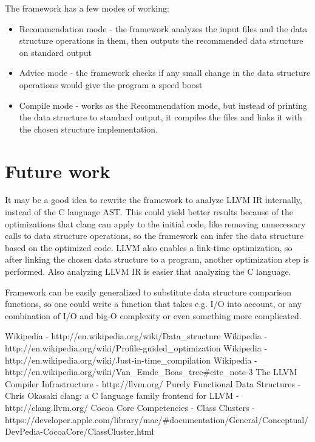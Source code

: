 \documentclass[a4paper,11pt]{article}
\begin{document}
	The framework has a few modes of working:
	\begin{itemize}
		\item Recommendation mode - the framework analyzes the input files and the data structure operations in
			them, then outputs the recommended data structure on standard output
		\item Advice mode - the framework checks if any small change in the data structure operations would give
			the program a speed boost
		\item Compile mode - works as the Recommendation mode, but instead of printing the data structure to
			standard output, it compiles the files and links it with the chosen structure implementation.
	\end{itemize}

\section{Future work} \label{sec:future}
	It may be a good idea to rewrite the framework to analyze LLVM\cite{LLVM} IR internally, instead of the C
	language AST. This could yield better results because of the optimizations that clang\cite{Clang} can apply to
	the initial code, like removing unnecessary calls to data structure operations, so the framework can infer the
	data structure based on the optimized code. LLVM also enables a link-time optimization, so after linking the
	chosen data structure to a program, another optimization step is performed. Also analyzing LLVM IR is easier
	that analyzing the C language.

    Framework can be easily generalized to substitute data structure comparison functions, so one could write a function
    that takes e.g. I/O into account, or any combination of I/O and big-O complexity or even something more complicated.

\begin{thebibliography}{9}
	 Wikipedia - http://en.wikipedia.org/wiki/Data\_structure
     Wikipedia - http://en.wikipedia.org/wiki/Profile-guided\_optimization
     Wikipedia - http://en.wikipedia.org/wiki/Just-in-time\_compilation
     Wikipedia - http://en.wikipedia.org/wiki/Van\_Emde\_Boas\_tree\#cite\_note-3
	 The LLVM Compiler Infrastructure - http://llvm.org/
	 Purely Functional Data Structures - Chris Okasaki
	 clang: a C language family frontend for LLVM - http://clang.llvm.org/
	 Cocoa Core Competencies - Class Clusters - \\
		https://developer.apple.com/library/mac/\#documentation/General/Conceptual/DevPedia-CocoaCore/ClassCluster.html
\end{thebibliography}
\end{document}
